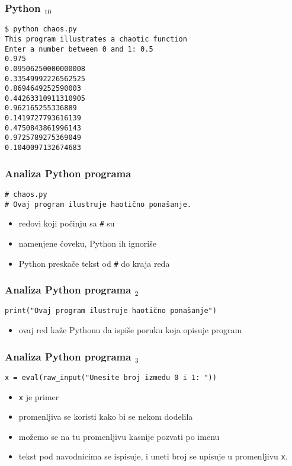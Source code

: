 \documentclass[utf8,compress]{beamer}
\begin{document}
\begin{frame}[fragile]
\frametitle{Python $_{10}$}
\begin{verbatim}
$ python chaos.py
This program illustrates a chaotic function
Enter a number between 0 and 1: 0.5
0.975
0.09506250000000008
0.33549992226562525
0.8694649252590003
0.44263310911310905
0.962165255336889
0.1419727793616139
0.4750843861996143
0.9725789275369049
0.1040097132674683
\end{verbatim}
\end{frame}

\begin{frame}[fragile]
\frametitle{Analiza Python programa}
\begin{verbatim}
# chaos.py
# Ovaj program ilustruje haotično ponašanje.
\end{verbatim}
\begin{itemize}
  \item redovi koji počinju sa \texttt{\#} su 
  \item namenjene čoveku, Python ih ignoriše
  \item Python preskače tekst od \texttt{\#} do kraja reda
\end{itemize}
\end{frame}

\begin{frame}[fragile]
\frametitle{Analiza Python programa $_2$}
\begin{verbatim}
print("Ovaj program ilustruje haotično ponašanje")
\end{verbatim}
\begin{itemize}
  \item ovaj red kaže Pythonu da ispiše poruku koja opisuje program
\end{itemize}
\end{frame}

\begin{frame}[fragile]
\frametitle{Analiza Python programa $_3$}
\begin{verbatim}
x = eval(raw_input("Unesite broj između 0 i 1: "))
\end{verbatim}
\begin{itemize}
  \item \texttt{x} je primer 
  \item promenljiva se koristi kako bi se nekom  dodelila 
  \item možemo se na tu promenljivu kasnije pozvati po imenu
  \item tekst pod navodnicima se ispisuje, i uneti broj se upisuje u promenljivu \texttt{x}.
\end{itemize}
\end{frame}
\end{document}
